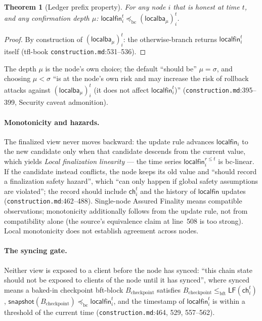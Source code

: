 \documentclass[11pt,a4paper]{article}
\newtheorem{theorem}{Theorem}[section]
\theoremstyle{definition}
\begin{document}
\begin{theorem}[Ledger prefix property]\label{thm:xl-ledger-prefix-wallet}
For any node $i$ that is honest at time $t$, and any confirmation depth
$\mu$: $\mathsf{localfin}_i^t \preceq_{\mathrm{bc}}
(\mathsf{localba}_{\mu})_i^t$.
\end{theorem}
\begin{proof}
By construction of $(\mathsf{localba}_{\mu})_i^t$: the otherwise-branch
returns $\mathsf{localfin}_i^t$ itself (tfl-book
\texttt{construction.md}:531--536).
\end{proof}

The depth $\mu$ is the node's own choice; the default ``should be'' $\mu =
\sigma$, and choosing $\mu < \sigma$ ``is at the node's own risk and may
increase the risk of rollback attacks against
$(\mathsf{localba}_{\mu})_i^t$ (it does not affect
$\mathsf{localfin}_i^t$)'' (\texttt{construction.md}:395--399, Security
caveat admonition).

\paragraph{Monotonicity and hazards.} The finalized view never moves
backward: the update rule advances $\mathsf{localfin}_i$ to the new
candidate only when that candidate descends from the current value, which
yields \emph{Local finalization linearity} --- the time series
$\mathsf{localfin}_i^{r \le t}$ is bc-linear. If the candidate instead
conflicts, the node keeps its old value and ``should record a finalization
safety hazard'', which ``can only happen if global safety assumptions are
violated''; the record should include $\mathsf{ch}_i^t$ and the history of
$\mathsf{localfin}$ updates (\texttt{construction.md}:462--488).
Single-node Assured Finality means compatible observations; monotonicity
additionally follows from the update rule, not from compatibility alone
(the source's equivalence claim at line~508 is too strong). Local
monotonicity does not establish agreement across nodes.

\paragraph{The syncing gate.} Neither view is exposed to a client before
the node has synced: ``this chain state should not be exposed to clients of
the node until it has synced'', where synced means a baked-in checkpoint
bft-block $B_{\mathrm{checkpoint}}$ satisfies $B_{\mathrm{checkpoint}}
\le_{\mathrm{bft}} \mathsf{LF}(\mathsf{ch}_i^t)$,
$\mathsf{snapshot}(B_{\mathrm{checkpoint}}) \preceq_{\mathrm{bc}}
\mathsf{localfin}_i^t$, and the timestamp of $\mathsf{localfin}_i^t$ is
within a threshold of the current time
(\texttt{construction.md}:464, 529, 557--562).
\end{document}
